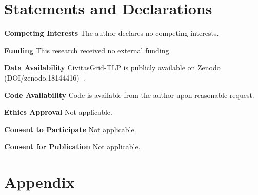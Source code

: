 \documentclass[pdflatex,sn-basic,Numbered]{sn-jnl}
\begin{document}
\section*{Statements and Declarations}
\textbf{Competing Interests} The author declares no competing interests.

\textbf{Funding} This research received no external funding. 

\textbf{Data Availability} CivitasGrid-TLP is publicly available on Zenodo (DOI/zenodo.18144416)~\cite{huang_2026_18144416}.

\textbf{Code Availability} Code is available from the author upon reasonable request.

\textbf{Ethics Approval} Not applicable.

\textbf{Consent to Participate} Not applicable.

\textbf{Consent for Publication} Not applicable.



\section{Appendix}
\end{document}

